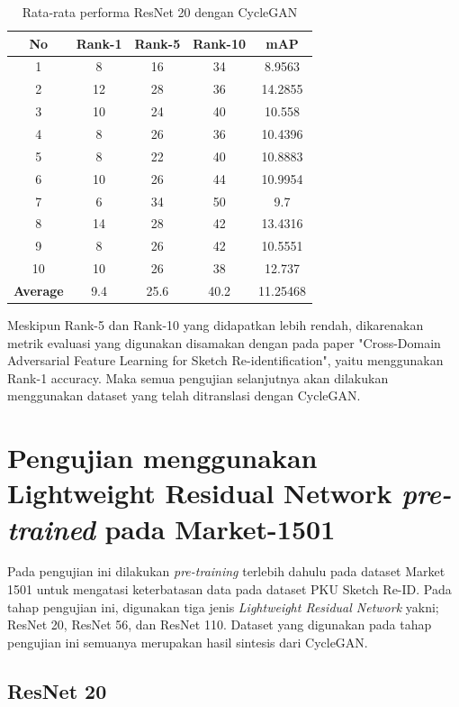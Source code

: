 \begin{longtable}{|c|c|c|c|c|}
	\caption{Rata-rata performa ResNet 20 dengan CycleGAN}
	\label{tabel: 6}\\
	\hline
	\rowcolor[HTML]{C0C0C0}
	\textbf{No} &\textbf{Rank-1} & \textbf{Rank-5} & \textbf{Rank-10} & \textbf{mAP} \\
	\hline
	1 & 8 & 16 & 34 & 8.9563\\
	2 & 12 & 28 & 36 & 14.2855\\
	3 & 10 & 24 & 40 & 10.558\\
	4 & 8 & 26 & 36 & 10.4396\\
	5 & 8 & 22 & 40 & 10.8883\\
	6 & 10 & 26 & 44 & 10.9954\\
	7 & 6 & 34 & 50 & 9.7\\
	8 & 14 & 28 & 42 & 13.4316\\
	9 & 8 & 26 & 42 & 10.5551\\
	10 & 10 & 26 & 38 & 12.737\\
	\hline
	\textbf{Average} & 9.4 & 25.6 & 40.2 & 11.25468\\
	\hline
\end{longtable}

Meskipun Rank-5 dan Rank-10 yang didapatkan lebih rendah, dikarenakan metrik evaluasi yang digunakan disamakan dengan pada paper "Cross-Domain Adversarial Feature Learning for Sketch Re-identification", yaitu menggunakan Rank-1 accuracy. Maka semua pengujian selanjutnya akan dilakukan menggunakan dataset yang telah ditranslasi dengan CycleGAN.

\section{Pengujian menggunakan Lightweight Residual Network \textit{pre-trained} pada Market-1501}
\label{sec:pretrained}

Pada pengujian ini dilakukan \textit{pre-training} terlebih dahulu pada dataset Market 1501 untuk mengatasi keterbatasan data pada dataset PKU Sketch Re-ID. Pada tahap pengujian ini, digunakan tiga jenis \textit{Lightweight Residual Network} yakni; ResNet 20, ResNet 56, dan ResNet 110. Dataset yang digunakan pada tahap pengujian ini semuanya merupakan hasil sintesis dari CycleGAN. 

\subsection{ResNet 20}

